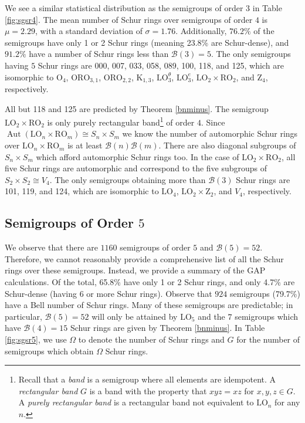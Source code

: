 \documentclass{article}
\theoremstyle{plain}
\theoremstyle{definition}
\newcommand{\thmref}[1]{Theorem \ref{#1}}
\newcommand{\B}{\mathscr{B}}
\renewcommand{\O}{\mathrm{O}}
\newcommand{\K}{\mathrm{K}}
\newcommand{\LO}{\mathrm{LO}}
\newcommand{\RO}{\mathrm{RO}}
\newcommand{\ORO}{\mathrm{ORO}}
\newcommand{\z}{\mathrm{Z}}
\DeclareMathOperator*{\Aut}{Aut}
\begin{document}
We see a similar statistical distribution as the semigroups of order $3$ in Table \ref{fig:sgsr4}. The mean number of Schur rings over semigroups of order $4$ is $\mu=2.29$, with a standard deviation of $\sigma=1.76$. Additionally, $76.2\%$ of the semigroups have only 1 or 2 Schur rings (meaning 23.8\% are Schur-dense), and $91.2\%$ have a number of Schur rings less than $\B(3)=5$. %
The only semigroups having $5$ Schur rings are 000, 007, 033, 058, 089, 100, 118, and 125, which are isomorphic to $\O_4$, $\ORO_{3,1}$, $\ORO_{2,2}$, $\K_{1,3}$, $\LO_3^\theta$, $\LO_3^e$, $\LO_2\times \RO_2$, and $\z_4$, respectively.

All but 118 and 125 are predicted by \thmref{bnminus}. The semigroup $\LO_2\times \RO_2$ is only purely rectangular band\footnote{Recall that a \emph{band} is a semigroup where all elements are idempotent. A \emph{rectangular band} $G$ is a band with the property that $xyz = xz$ for $x,y,z\in G$. A \emph{purely rectangular band} is a rectangular band not equivalent to $\LO_n$ for any $n$.} of order $4$. Since $\Aut(\LO_n\times \RO_m) \cong S_n\times S_m$ we know the number of automorphic Schur rings over $\LO_n\times \RO_m$ is at least $\B(n)\B(m)$. There are also diagonal subgroups of $S_n\times S_m$ which afford automorphic Schur rings too. In the case of $\LO_2\times\RO_2$, all five Schur rings are automorphic and correspond to the five subgroups of $S_2\times S_2\cong V_4$. The only semigroups obtaining more than $\B(3)$ Schur rings are 101, 119, and 124, which are isomorphic to $\LO_4$, $\LO_2\times \z_2$, and $V_4$, respectively.

\subsection{Semigroups of Order $5$}
We observe that there are $1160$ semigroups of order $5$ and $\B(5)=52$. Therefore, we cannot reasonably provide a comprehensive list of all the Schur rings over these semigroups. Instead, we provide a summary of the GAP calculations. Of the total, 65.8\% have only 1 or 2 Schur rings, and only 4.7\% are Schur-dense (having 6 or more Schur rings). Observe that $924$  semigroups (79.7\%) have a Bell number of Schur rings. Many of these semigroups are predictable; in particular, $\B(5)=52$ will only be attained by $\LO_5$ and the $7$ semigroups which have $\B(4)=15$ Schur rings are given by Theorem \ref{bnminus}. In Table \ref{fig:sgsr5}, we use $\Omega$ to denote the number of Schur rings and $G$ for the number of semigroups which obtain $\Omega$ Schur rings.
\end{document}
